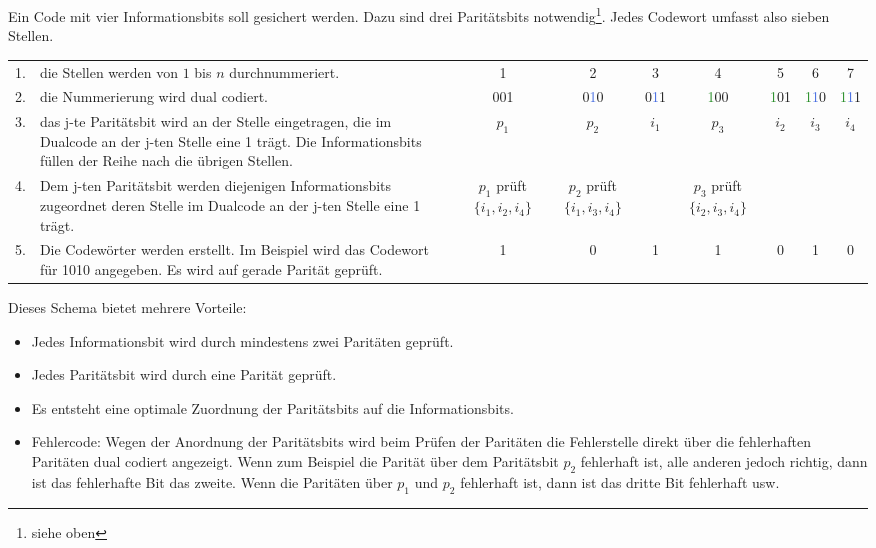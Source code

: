 Ein Code mit vier Informationsbits soll gesichert werden. Dazu sind drei
Paritätsbits notwendig\footnote{siehe oben}. Jedes Codewort umfasst also sieben
Stellen.
\begin{center}
\begin{tabular}{rp{3.6cm}ccccccc}
1. & die Stellen werden von $1$ 
     bis $n$ durchnummeriert.   &  1  &  2  &  3  &  4  &  5  &  6  &  7  \\
2. & die Nummerierung wird
     dual codiert.       & 00\textcolor{BrickRed}{1}
                          & 0\textcolor{RoyalBlue}{1}0 
     					   & 0\textcolor{RoyalBlue}{1}\textcolor{BrickRed}{1} 
						    & \textcolor{ForestGreen}{1}00 
						     & \textcolor{ForestGreen}{1}0\textcolor{BrickRed}{1}
						      & \textcolor{ForestGreen}{1}\textcolor{RoyalBlue}{1}0 
						       & \textcolor{ForestGreen}{1}\textcolor{RoyalBlue}{1}\textcolor{BrickRed}{1} \\
3. & das j-te Paritätsbit wird
     an der Stelle  eingetragen, 
     die im Dualcode an der j-ten Stelle eine 1 trägt. Die
     Informationsbits füllen
     der Reihe nach die 
     übrigen Stellen.           &$p_1$&$p_2$&$i_1$&$p_3$&$i_2$&$i_3$&$i_4$ \\
4. & Dem j-ten Paritätsbit
     werden diejenigen Informationsbits zugeordnet
     deren Stelle  im Dualcode an der j-ten Stelle
     eine 1 trägt. & \parbox[t]{1.5cm}{\centering $p_1$ \\ prüft \\$\{i_1,i_2,i_4\}$}
     & \parbox[t]{1.5cm}{\centering $p_2$ \\ prüft \\ $\{i_1,i_3,i_4\}$}
     & & \parbox[t]{1.5cm}{\centering $p_3$ \\ prüft \\ $\{i_2,i_3,i_4\}$} \\
5. & Die Codewörter werden erstellt.
     Im Beispiel wird das Codewort für 1010 angegeben. 
     Es wird auf gerade Parität geprüft. & 1 & 0 & 1 & 1 & 0 & 1 & 0 \\ 
     
\end{tabular}
\end{center}

Dieses Schema bietet mehrere Vorteile:
\begin{itemize}
\item
	Jedes Informationsbit wird durch mindestens zwei Paritäten geprüft.
\item
	Jedes Paritätsbit wird durch eine Parität geprüft.
\item
	Es entsteht eine optimale Zuordnung der Paritätsbits auf die Informationsbits.
\item
	Fehlercode: Wegen der Anordnung der Paritätsbits wird beim Prüfen der Paritäten die Fehlerstelle direkt über die fehlerhaften Paritäten dual codiert angezeigt. Wenn zum Beispiel die Parität über dem Paritätsbit $p_2$ fehlerhaft ist, alle anderen jedoch richtig, dann ist das fehlerhafte Bit das zweite. Wenn die Paritäten über $p_1$ und $p_2$ fehlerhaft ist, dann ist das dritte Bit fehlerhaft usw.
\end{itemize}

